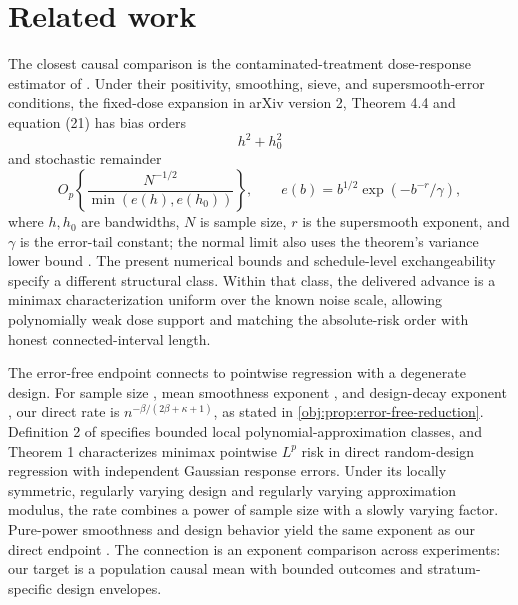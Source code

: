 \documentclass[11pt]{article}
\begin{document}
\section{Related work}

The closest causal comparison is the contaminated-treatment dose-response estimator of \citet{HuangZhang2023}. Under their positivity, smoothing, sieve, and supersmooth-error conditions, the fixed-dose expansion in arXiv version 2, Theorem 4.4 and equation (21) has bias orders
\[
h^2+h_0^2
\]
and stochastic remainder
\[
O_p\!\left\{\frac{N^{-1/2}}{\min(e(h),e(h_0))}\right\},
\qquad
e(b)=b^{1/2}\exp(-b^{-r}/\gamma),
\]
where \(h,h_0\) are bandwidths, \(N\) is sample size, \(r\) is the supersmooth exponent, and \(\gamma\) is the error-tail constant; the normal limit also uses the theorem's variance lower bound \citep[arXiv version 2, Theorem 4.4, equation (21)]{HuangZhang2023}. The present numerical bounds and schedule-level exchangeability specify a different structural class. Within that class, the delivered advance is a minimax characterization uniform over the known noise scale, allowing polynomially weak dose support and matching the absolute-risk order with honest connected-interval length.

The error-free endpoint connects to pointwise regression with a degenerate design. For sample size , mean smoothness exponent \leanref{sym:beta(smoothness exponent in (0,1])}{\ensuremath{\beta}}, and design-decay exponent , our direct rate is \(n^{-\beta/(2\beta+\kappa+1)}\), as stated in \cref{obj:prop:error-free-reduction}. Definition 2 of \citet{Gaiffas2005} specifies bounded local polynomial-approximation classes, and Theorem 1 characterizes minimax pointwise \(L^p\) risk in direct random-design regression with independent Gaussian response errors. Under its locally symmetric, regularly varying design and regularly varying approximation modulus, the rate combines a power of sample size with a slowly varying factor. Pure-power smoothness and design behavior yield the same exponent as our direct endpoint \citep[Definition 2 and Theorem 1]{Gaiffas2005}. The connection is an exponent comparison across experiments: our target is a population causal mean with bounded outcomes and stratum-specific design envelopes.
\end{document}
